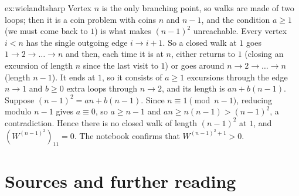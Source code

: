 \begin{solution}{ex:wielandtsharp}
\idea Vertex $n$ is the only branching point, so walks are made of two loops; then it is a coin problem with coins $n$ and
$n-1$, and the condition $a\ge1$ (we must come back to $1$) is what makes $(n-1)^2$ unreachable.
\writeup Every vertex $i<n$ has the single outgoing edge $i\to i+1$. So a closed walk at $1$ goes $1\to2\to\dots\to n$ and then,
each time it is at $n$, either returns to $1$ (closing an excursion of length $n$ since the last visit to $1$) or goes around
$n\to2\to\dots\to n$ (length $n-1$). It ends at $1$, so it consists of $a\ge1$ excursions through the edge $n\to1$ and $b\ge0$ extra
loops through $n\to2$, and its length is $an+b(n-1)$. Suppose $(n-1)^2=an+b(n-1)$. Since $n\equiv1\pmod{n-1}$, reducing modulo
$n-1$ gives $a\equiv0$, so $a\ge n-1$ and $an\ge n(n-1)>(n-1)^2$, a contradiction. Hence there is no closed walk of length
$(n-1)^2$ at $1$, and $(W^{(n-1)^2})_{11}=0$. The notebook confirms that $W^{(n-1)^2+1}>0$.
\end{solution}

\section*{Sources and further reading}

